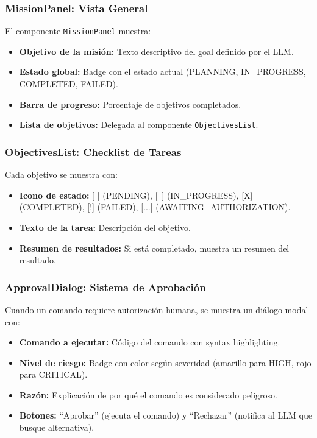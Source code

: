 \subsubsection{MissionPanel: Vista General}

El componente \texttt{MissionPanel} muestra:

\begin{itemize}
    \item \textbf{Objetivo de la misión:} Texto descriptivo del goal definido por el LLM.
    \item \textbf{Estado global:} Badge con el estado actual (PLANNING, IN\_PROGRESS, COMPLETED, FAILED).
    \item \textbf{Barra de progreso:} Porcentaje de objetivos completados.
    \item \textbf{Lista de objetivos:} Delegada al componente \texttt{ObjectivesList}.
\end{itemize}

\subsubsection{ObjectivesList: Checklist de Tareas}

Cada objetivo se muestra con:

\begin{itemize}
    \item \textbf{Icono de estado:} [ ] (PENDING), [~] (IN\_PROGRESS), [X] (COMPLETED), [!] (FAILED), [...] (AWAITING\_AUTHORIZATION).
    \item \textbf{Texto de la tarea:} Descripción del objetivo.
    \item \textbf{Resumen de resultados:} Si está completado, muestra un resumen del resultado.
\end{itemize}

\subsubsection{ApprovalDialog: Sistema de Aprobación}

Cuando un comando requiere autorización humana, se muestra un diálogo modal con:

\begin{itemize}
    \item \textbf{Comando a ejecutar:} Código del comando con syntax highlighting.
    \item \textbf{Nivel de riesgo:} Badge con color según severidad (amarillo para HIGH, rojo para CRITICAL).
    \item \textbf{Razón:} Explicación de por qué el comando es considerado peligroso.
    \item \textbf{Botones:} ``Aprobar'' (ejecuta el comando) y ``Rechazar'' (notifica al LLM que busque alternativa).
\end{itemize}


